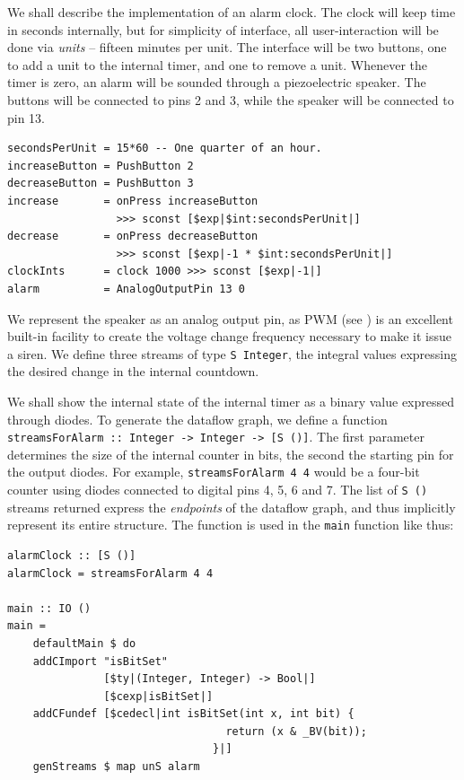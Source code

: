 \documentclass[a4paper, oneside, final]{memoir}
\let\Fref\undefined
\begin{document}
We shall describe the implementation of an alarm clock.  The clock
will keep time in seconds internally, but for simplicity of interface,
all user-interaction will be done via \textit{units} -- fifteen
minutes per unit.  The interface will be two buttons, one to add a
unit to the internal timer, and one to remove a unit.  Whenever the
timer is zero, an alarm will be sounded through a piezoelectric
speaker.  The buttons will be connected to pins 2 and 3, while the
speaker will be connected to pin 13.


\begin{verbatim}
secondsPerUnit = 15*60 -- One quarter of an hour.
increaseButton = PushButton 2
decreaseButton = PushButton 3
increase       = onPress increaseButton 
                 >>> sconst [$exp|$int:secondsPerUnit|]
decrease       = onPress decreaseButton 
                 >>> sconst [$exp|-1 * $int:secondsPerUnit|]
clockInts      = clock 1000 >>> sconst [$exp|-1|]
alarm          = AnalogOutputPin 13 0
\end{verbatim}

We represent the speaker as an analog output pin, as PWM (see
\Fref{sec:pwm}) is an excellent built-in facility to create the
voltage change frequency necessary to make it issue a siren.  We
define three streams of type \texttt{S Integer}, the integral values
expressing the desired change in the internal countdown.

We shall show the internal state of the internal timer as a binary
value expressed through diodes.  To generate the dataflow graph, we
define a function \texttt{streamsForAlarm :: Integer -> Integer -> [S
  ()]}.  The first parameter determines the size of the internal
counter in bits, the second the starting pin for the output diodes.
For example, \texttt{streamsForAlarm 4 4} would be a four-bit counter
using diodes connected to digital pins 4, 5, 6 and 7.  The list of
\texttt{S ()} streams returned express the \textit{endpoints} of the
dataflow graph, and thus implicitly represent its entire structure.
The function is used in the \texttt{main} function like thus:

\begin{verbatim}
alarmClock :: [S ()]
alarmClock = streamsForAlarm 4 4

main :: IO ()
main =
    defaultMain $ do
    addCImport "isBitSet" 
               [$ty|(Integer, Integer) -> Bool|] 
               [$cexp|isBitSet|]
    addCFundef [$cedecl|int isBitSet(int x, int bit) {
                                  return (x & _BV(bit));
                                }|]
    genStreams $ map unS alarm
\end{verbatim}
\end{document}
